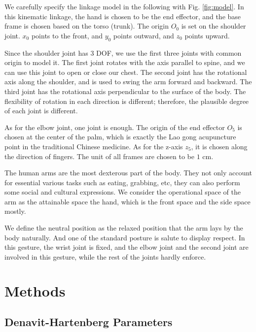 \documentclass[xcolor=x11names]{article}
\begin{document}
   We carefully specify the linkage model in the following with Fig. \ref{fig:model}. In this kinematic linkage, the hand is chosen to be the end effector, and the base frame is chosen based on the torso (trunk). The origin $O_0$ is set on the shoulder joint. $x_0$ points to the front, and $y_0$ points outward, and $z_0$ points upward. 
   
   
   
   Since the shoulder joint has 3 DOF, we use the first three joints with common origin to model it. The first joint rotates with the axis parallel to spine, and we can use this joint to open or close our chest. The second joint has the rotational axis along the shoulder, and is used to swing the arm forward and backward. The third joint has the rotational axis perpendicular to the surface of the body. The flexibility of rotation in each direction is different; therefore, the plausible degree of each joint is different. 
   
   
   As for the elbow joint, one joint is enough. The origin of the end effector $O_5$ is chosen at the center of the palm, which is exactly the Lao gong acupuncture point in the traditional Chinese medicine. As for the z-axis $z_5$, it is chosen along the direction of fingers. The unit of all frames are chosen to be $1$ cm.
   
   
   The human arms are the most dexterous part of the body. They not only account for essential various tasks such as eating, grabbing, etc, they can also perform some social and cultural expressions. We consider the operational space of the arm as the attainable space the hand, which is the front space and the side space mostly.
   
   We define the neutral position as the relaxed position that the arm lays by the body naturally. And one of the standard posture is salute to display respect. In this gesture, the wrist joint is fixed, and the elbow joint and the second joint are involved in this gesture, while the rest of the joints hardly enforce.


\section{Methods}





\subsection{Denavit-Hartenberg Parameters}
\end{document}
